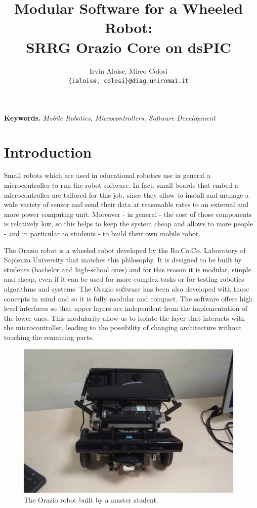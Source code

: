 \documentclass[10pt,a4paper, notitlepage]{report}
\title{Modular Software for a Wheeled Robot:\\SRRG Orazio Core on dsPIC}
\author{Irvin Aloise, Mirco Colosi\\ \tt\small \{ialoise, colosi\}@diag.uniroma1.it}
\begin{document}
\maketitle


\textbf{Keywords.} \textit{Mobile Robotics, Microcontrollers, Software Development}

\section*{Introduction} \label{sec:intro}
\lettrine{S}{}mall robots which are used in educational robotics use in general a microcontroller to run the robot software. In fact, small boards that embed a microcontroller are tailored for this job, since they allow to install and manage a wide variety of sensor and send their data at reasonable rates to an external and more power computing unit. Moreover - in general - the cost of those components is relatively low, so this helps to keep the system cheap and allows to more people - and in particular to students - to build their own mobile robot.

The Orazio robot is a wheeled robot developed by the Ro.Co.Co. Laboratory of Sapienza University that matches this philosophy. It is designed to be built by students (bachelor and high-school ones) and for this reason it is modular, simple and cheap, even if it can be used for more complex tasks or for testing robotics algorithms and systems. The Orazio software has been also developed with those concepts in mind and so it is fully modular and compact. The software offers high level interfaces so that upper layers are independent from the implementation of the lower ones. This modularity allow us to isolate the layer that interacts with the microcontroller, leading to the possibility of changing architecture without touching the remaining parts.

\begin{figure}[!h]
  \centering
  \includegraphics[width=0.75\linewidth]{pics/orazio}
  \caption{The Orazio robot built by a master student.}
  \label{fig:orazio}
\end{figure}
\end{document}
